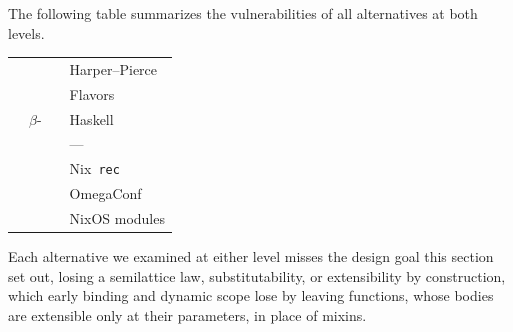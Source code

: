 \begin{CJK*}{UTF8}{gbsn}
\noindent
The following table summarizes the vulnerabilities of all
alternatives at both levels.

{\small\typewriterInlineCodeInHtml
\begin{center}
  \begin{tabular}{llL{0.3\textwidth}L{0.3\textwidth}}
    &  & 
    &  \\
    \hline
    & 
    & 
    & Harper--Pierce \\
    & 
    & 
    & Flavors \\
    & $\beta$-
    & 
    & Haskell \\
    & 
    & 
    & --- \\
    \hline
    & 
    & 
    & Nix~\texttt{rec} \\
    & 
    & 
    & OmegaConf \\
    & 
    & 
    & NixOS modules \\
  \end{tabular}
\end{center}
}

\noindent
Each alternative we examined at either level misses the design goal
this section set out, losing a semilattice law, substitutability, or
extensibility by construction, which early binding and dynamic scope
lose by leaving functions, whose bodies are extensible only at their
parameters, in place of mixins.


\end{CJK*}

